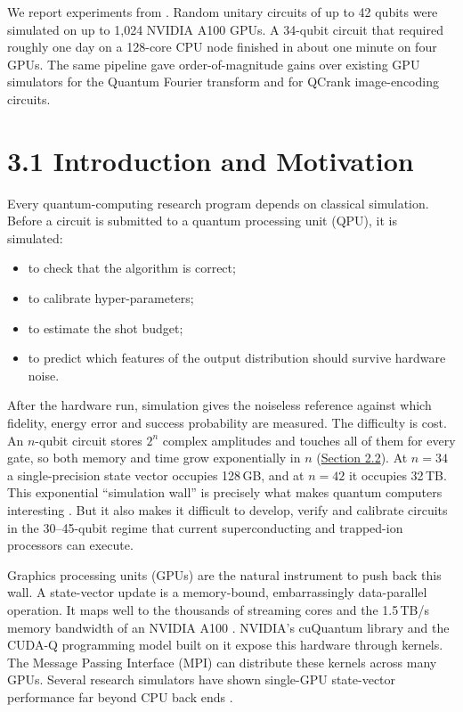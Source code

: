 \documentclass{report}
\theoremstyle{plain}
\theoremstyle{definition}
\theoremstyle{remark}
\begin{document}
We report experiments from \cite{guo2025qgear}. Random unitary circuits of up to 42 qubits were simulated on up to 1,024 NVIDIA A100 GPUs. A 34-qubit circuit that required roughly one day on a 128-core CPU node finished in about one minute on four GPUs. The same pipeline gave order-of-magnitude gains over existing GPU simulators for the Quantum Fourier transform and for QCrank image-encoding circuits.

\section{3.1 Introduction and Motivation}\label{sec:qgear:intro}

Every quantum-computing research program depends on classical simulation. Before a circuit is submitted to a quantum processing unit (QPU), it is simulated:
\begin{itemize}
  \item to check that the algorithm is correct;
  \item to calibrate hyper-parameters;
  \item to estimate the shot budget;
  \item to predict which features of the output distribution should survive hardware noise.
\end{itemize}
After the hardware run, simulation gives the noiseless reference against which fidelity, energy error and success probability are measured. The difficulty is cost. An $n$-qubit circuit stores $2^{n}$ complex amplitudes and touches all of them for every gate, so both memory and time grow exponentially in $n$ (\hyperref[sec:bg:sim]{Section 2.2}). At $n=34$ a single-precision state vector occupies 128 GB, and at $n=42$ it occupies 32 TB. This exponential ``simulation wall'' is precisely what makes quantum computers interesting \cite{arute2019supremacy,preskill2018nisq}. But it also makes it difficult to develop, verify and calibrate circuits in the 30--45-qubit regime that current superconducting and trapped-ion processors can execute.

Graphics processing units (GPUs) are the natural instrument to push back this wall. A state-vector update is a memory-bound, embarrassingly data-parallel operation. It maps well to the thousands of streaming cores and the 1.5 TB/s memory bandwidth of an NVIDIA A100 \cite{choquette2021a100}. NVIDIA's cuQuantum library \cite{bayraktar2023cuquantum} and the CUDA-Q programming model built on it \cite{kim2023cudaquantum} expose this hardware through kernels. The Message Passing Interface (MPI) can distribute these kernels across many GPUs. Several research simulators have shown single-GPU state-vector performance far beyond CPU back ends \cite{suzuki2021qulacs,vanbeeumen2023qclabpp,doi2023multishotgpu,asadi2024pennylanelightning}.
\end{document}

